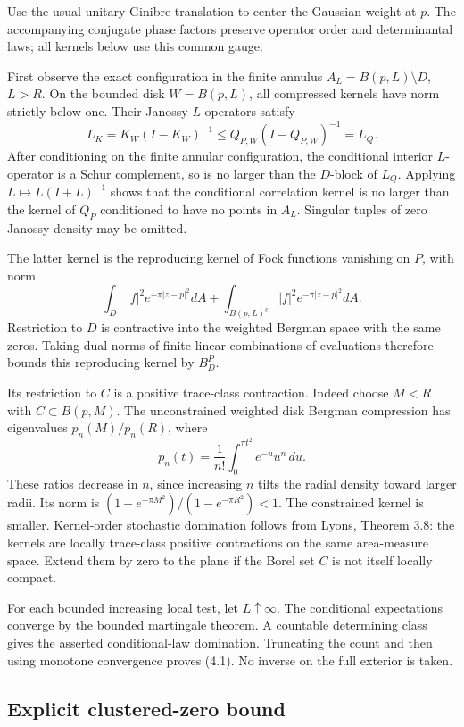 \documentclass[11pt,a4paper]{article}
\theoremstyle{definition}
\theoremstyle{remark}
\numberwithin{equation}{section}
\begin{document}
Use the usual unitary Ginibre translation to center the Gaussian weight at \(p\). The accompanying conjugate phase factors preserve operator order and determinantal laws; all kernels below use this common gauge.

First observe the exact configuration in the finite annulus \(A_L=B(p,L)\setminus D\), \(L>R\). On the bounded disk \(W=B(p,L)\), all compressed kernels have norm strictly below one. Their Janossy \(L\)-operators satisfy \[
L_K=K_W(I-K_W)^{-1}
\le Q_{P,W}(I-Q_{P,W})^{-1}=L_Q.
\] After conditioning on the finite annular configuration, the conditional interior \(L\)-operator is a Schur complement, so is no larger than the \(D\)-block of \(L_Q\). Applying \(L\mapsto L(I+L)^{-1}\) shows that the conditional correlation kernel is no larger than the kernel of \(Q_P\) conditioned to have no points in \(A_L\). Singular tuples of zero Janossy density may be omitted.

The latter kernel is the reproducing kernel of Fock functions vanishing on \(P\), with norm \[
\int_D |f|^2e^{-\pi|z-p|^2}dA
+\int_{B(p,L)^c}|f|^2e^{-\pi|z-p|^2}dA.
\] Restriction to \(D\) is contractive into the weighted Bergman space with the same zeros. Taking dual norms of finite linear combinations of evaluations therefore bounds this reproducing kernel by \(B_D^P\).

Its restriction to \(C\) is a positive trace-class contraction. Indeed choose \(M<R\) with \(C\subset B(p,M)\). The unconstrained weighted disk Bergman compression has eigenvalues \(p_n(M)/p_n(R)\), where \[
p_n(t)=\frac1{n!}\int_0^{\pi t^2}e^{-u}u^n\,du.
\] These ratios decrease in \(n\), since increasing \(n\) tilts the radial density toward larger radii. Its norm is \((1-e^{-\pi M^2})/(1-e^{-\pi R^2})<1\). The constrained kernel is smaller. Kernel-order stochastic domination follows from \href{https://arxiv.org/html/1406.2707v1}{Lyons, Theorem 3.8}: the kernels are locally trace-class positive contractions on the same area-measure space. Extend them by zero to the plane if the Borel set \(C\) is not itself locally compact.

For each bounded increasing local test, let \(L\uparrow\infty\). The conditional expectations converge by the bounded martingale theorem. A countable determining class gives the asserted conditional-law domination. Truncating the count and then using monotone convergence proves (4.1). No inverse on the full exterior is taken.

\hypertarget{explicit-clustered-zero-bound}{%
\subsection{Explicit clustered-zero bound}\label{explicit-clustered-zero-bound}}
\end{document}
